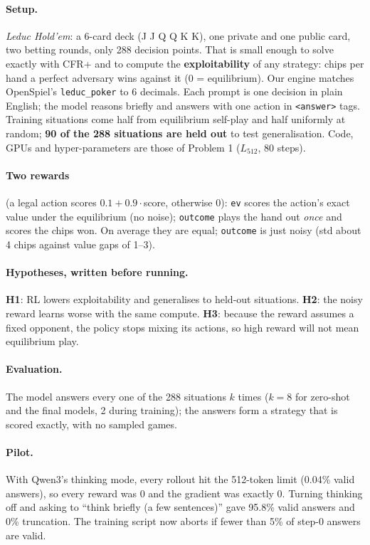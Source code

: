 \documentclass[10.5pt]{article}
\newcommand{\code}[1]{\texttt{#1}}
\begin{document}
\paragraph{Setup.} \emph{Leduc Hold'em}: a 6-card deck (J J Q Q K K), one private and one public card, two betting rounds,
only 288 decision points. That is small enough to solve exactly with CFR+ and to compute the \textbf{exploitability} of any
strategy: chips per hand a perfect adversary wins against it (0 = equilibrium). Our engine matches OpenSpiel's
\code{leduc\_poker} to 6 decimals. Each prompt is one decision in plain English; the model reasons briefly and answers with
one action in \code{<answer>} tags. Training situations come half from equilibrium self-play and half uniformly at random;
\textbf{90 of the 288 situations are held out} to test generalisation. Code, GPUs and hyper-parameters are those of
Problem 1 ($L_{512}$, 80 steps).

\paragraph{Two rewards} (a legal action scores $0.1+0.9\cdot$score, otherwise 0):
\code{ev} scores the action's exact value under the equilibrium (no noise); \code{outcome} plays the hand out \emph{once}
and scores the chips won. On average they are equal; \code{outcome} is just noisy (std about 4 chips against value
gaps of 1--3).

\paragraph{Hypotheses, written before running.} \textbf{H1}: RL lowers exploitability and generalises to held-out
situations. \textbf{H2}: the noisy reward learns worse with the same compute. \textbf{H3}: because the reward assumes a
fixed opponent, the policy stops mixing its actions, so high reward will not mean equilibrium play.

\paragraph{Evaluation.} The model answers every one of the 288 situations $k$ times ($k=8$ for zero-shot and the final
models, 2 during training); the answers form a strategy that is scored exactly, with no sampled games.

\paragraph{Pilot.} With Qwen3's thinking mode, every rollout hit the 512-token limit (0.04\% valid answers), so every
reward was 0 and the gradient was exactly 0. Turning thinking off and asking to ``think briefly (a few sentences)'' gave
95.8\% valid answers and 0\% truncation. The training script now aborts if fewer than 5\% of step-0 answers are valid.
\end{document}
